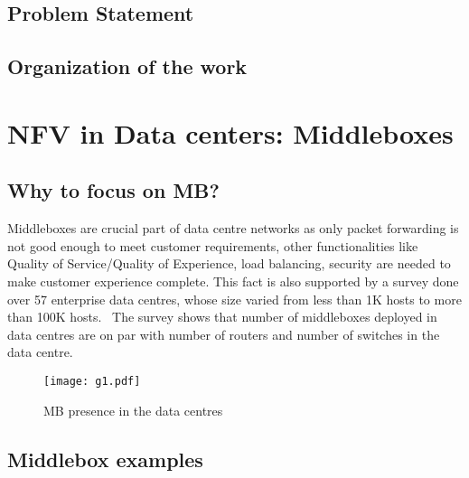 \documentclass[a4paper,11pt]{report}
\begin{document}
\section{Problem Statement}        
\section{Organization of the work}  

\chapter{NFV in Data centers: Middleboxes}
\section{Why to focus on MB?}
\noindent Middleboxes are crucial part of data centre networks as only packet forwarding is not good enough to meet customer requirements, other functionalities like Quality of Service/Quality of Experience, load balancing, security are needed to make customer experience complete. This fact is also supported by a survey done over 57 enterprise data centres, whose size varied from less than 1K hosts to more than 100K hosts.~\cite{DM} The survey shows that number of middleboxes deployed in data centres are on par with number of routers and number of switches in the data centre.  
\begin{figure}[h]
\centering
\texttt{[image: g1.pdf]}
\caption{MB presence in the data centres~\cite{DM}}
\end{figure} 
\section{Middlebox examples}
\end{document}
